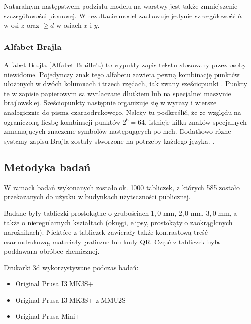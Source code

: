 \documentclass[12pt,a4paper]{article}
\begin{document}
Naturalnym następstwem podziału modelu na warstwy jest także zmniejszenie szczegółowości pionowej.
W rezultacie model zachowuje jedynie szczegółowość $h$ w osi $z$ oraz $\geq d$ w osiach $x$ i $y$.

\subsubsection{Alfabet Brajla}
Alfabet Brajla (Alfabet Braille'a) to wypukły zapis tekstu stosowany przez osoby niewidome. Pojedynczy znak tego alfabetu zawiera pewną kombinację punktów ułożonych w dwóch kolumnach i trzech rzędach, tak zwany sześciopunkt \cite{braille}. Punkty te w zapisie papierowym są wytłaczane dłutkiem lub na specjalnej maszynie brajlowskiej.
Sześciopunkty następnie organizuje się w wyrazy i wiersze analogicznie do pisma czarnodrukowego.
Należy tu podkreślić, że ze względu na ograniczoną liczbę kombinacji punktów $2^6=64$, istnieje kilka znaków specjalnych zmieniających znaczenie symbolów następujących po nich. Dodatkowo różne systemy zapisu Brajla zostały stworzone na potrzeby każdego języka. \cite{braillepolish} \cite{brailleenglish} .


\subsection{Metodyka badań}
W ramach badań wykonanych zostało ok. 1000 tabliczek, z których 585 zostało przekazanych do użytku w budynkach użyteczności publicznej.

Badane były tabliczki prostokątne o grubościach $1{,}0 \text{ mm}$, $2{,}0 \text{ mm}$, $3{,}0 \text{ mm}$, a także o nieregularnych kształtach (okręgi, elipsy, prostokąty o zaokrąglonych narożnikach).
Niektóre z tabliczek zawierały także kontrastową treść czarnodrukową, materiały graficzne lub kody QR.
Część z tabliczek była poddawana obróbce chemicznej.

Drukarki 3d wykorzystywane podczas badań:
\begin{itemize}
\item Original Prusa I3 MK3S+
\item Original Prusa I3 MK3S+ z MMU2S
\item Original Prusa Mini+
\end{itemize}
\end{document}
